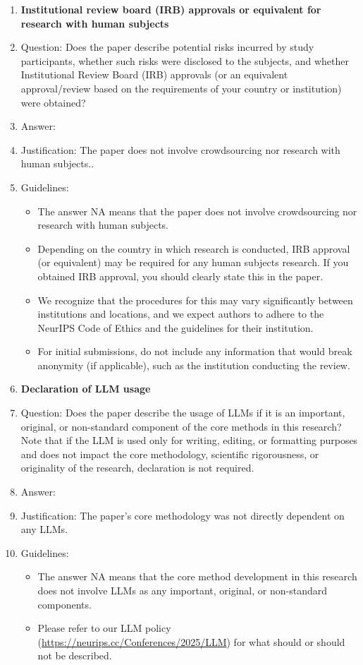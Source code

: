\documentclass{article}
\theoremstyle{definition} \newtheorem{definition}{Definition}  \newtheorem{example}{Example}
\theoremstyle{remark} \newtheorem{remark}{Remark}
\newcounter{ct}
\begin{document}
\begin{enumerate}
\item {\bf Institutional review board (IRB) approvals or equivalent for research with human subjects}
    \item[] Question: Does the paper describe potential risks incurred by study participants, whether such risks were disclosed to the subjects, and whether Institutional Review Board (IRB) approvals (or an equivalent approval/review based on the requirements of your country or institution) were obtained?
    \item[] Answer: \answerNA{} %
    \item[] Justification: The paper does not involve crowdsourcing nor research with human subjects..
    \item[] Guidelines:
    \begin{itemize}
        \item The answer NA means that the paper does not involve crowdsourcing nor research with human subjects.
        \item Depending on the country in which research is conducted, IRB approval (or equivalent) may be required for any human subjects research. If you obtained IRB approval, you should clearly state this in the paper. 
        \item We recognize that the procedures for this may vary significantly between institutions and locations, and we expect authors to adhere to the NeurIPS Code of Ethics and the guidelines for their institution. 
        \item For initial submissions, do not include any information that would break anonymity (if applicable), such as the institution conducting the review.
    \end{itemize}

\item {\bf Declaration of LLM usage}
    \item[] Question: Does the paper describe the usage of LLMs if it is an important, original, or non-standard component of the core methods in this research? Note that if the LLM is used only for writing, editing, or formatting purposes and does not impact the core methodology, scientific rigorousness, or originality of the research, declaration is not required.
    \item[] Answer: \answerNA{} %
    \item[] Justification: The paper's core methodology was not directly dependent on any LLMs.
    \item[] Guidelines:
    \begin{itemize}
        \item The answer NA means that the core method development in this research does not involve LLMs as any important, original, or non-standard components.
        \item Please refer to our LLM policy (\url{https://neurips.cc/Conferences/2025/LLM}) for what should or should not be described.
    \end{itemize}

\end{enumerate}
\fi
\end{document}
